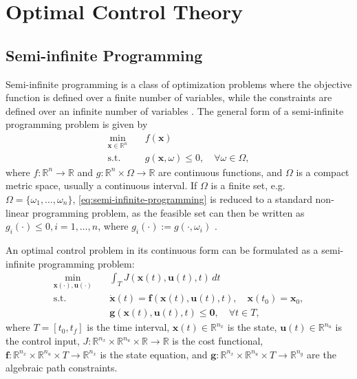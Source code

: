 \section{Optimal Control Theory}
\subsection{Semi-infinite Programming}\label{sec:semi-infinite-programming}

Semi-infinite programming is a class of optimization problems where the objective function is defined over a finite number of variables, while the constraints are defined over an infinite number of variables \citep{Bonnans2013-gt}. The general form of a semi-infinite programming problem is given by
\begin{equation}\label{eq:semi-infinite-programming}
    \begin{aligned}
        \min_{\mathbf x \in \mathbb R^n} \quad & f(\mathbf x) \\
        \text{s.t.} \quad & g(\mathbf x, \omega) \leq 0, \quad \forall \omega \in \Omega,
    \end{aligned}
\end{equation}
where $f : \mathbb R^n \to \mathbb R$ and $g : \mathbb R^n \times \Omega \to \mathbb R$ are continuous functions, and $\Omega$ is a compact metric space, usually a continuous interval. If $\Omega$ is a finite set, e.g. $\Omega = \{\omega_1,\ldots,\omega_n\}$, \cref{eq:semi-infinite-programming} is reduced to a standard non-linear programming problem, as the feasible set can then be written as $g_i(\cdot) \leq 0, i = 1,\ldots,n$, where $g_i(\cdot) := g(\cdot, \omega_i)$ \citep{Bonnans2013-gt}.

An optimal control problem in its continuous form can be formulated as a semi-infinite programming problem:
\begin{equation}\label{eq:optimal-control-problem}
    \begin{aligned}
        \min_{\mathbf{x}(\cdot), \mathbf{u}(\cdot)} \quad & \int_{T} J(\mathbf{x}(t), \mathbf{u}(t), t) \, dt \\
        \text{s.t.} \quad & \dot{\mathbf{x}}(t) = \mathbf f(\mathbf{x}(t), \mathbf{u}(t), t), \quad \mathbf{x}(t_0) = \mathbf{x}_0, \\
        & \mathbf g(\mathbf{x}(t), \mathbf{u}(t), t) \leq \mathbf 0, \quad \forall t \in T,
    \end{aligned}
\end{equation}
where $T = [t_0, t_f]$ is the time interval, $\mathbf{x}(t) \in \mathbb R^{n_x}$ is the state, $\mathbf{u}(t) \in \mathbb R^{n_u}$ is the control input, $J : \mathbb R^{n_x} \times \mathbb R^{n_u} \times \mathbb R \to \mathbb R$ is the cost functional, $\mathbf f : \mathbb R^{n_x} \times \mathbb R^{n_u} \times T \to \mathbb R^{n_x}$ is the state equation, and $\mathbf g : \mathbb R^{n_x} \times \mathbb R^{n_u} \times T \to \mathbb R^{n_g}$ are the algebraic path constraints.

